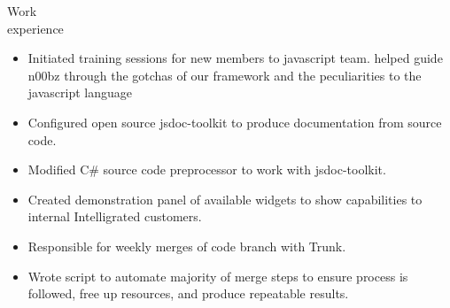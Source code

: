\begin{category}{Work \\experience}
\begin{itemize}
\item Initiated training sessions for new members to javascript team. helped guide n00bz through the gotchas of our framework and the peculiarities to the javascript language
\item Configured open source jsdoc-toolkit to produce documentation from source code.
\item Modified C\# source code preprocessor to work with jsdoc-toolkit. %
\item Created demonstration panel of available widgets to show capabilities to internal Intelligrated customers. 
\item Responsible for weekly merges of code branch with Trunk.
\item Wrote script to automate majority of merge steps to ensure process is followed, free up resources, and produce repeatable results. %



\end{itemize}



\end{category}
